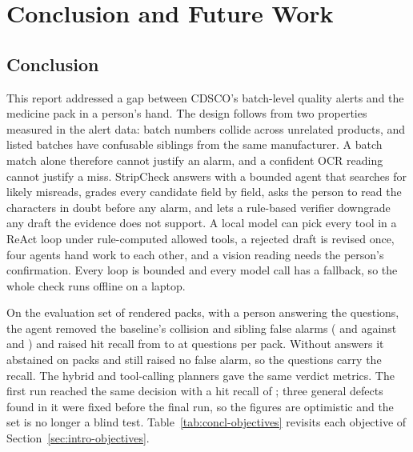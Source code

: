 \chapter{Conclusion and Future Work}
\label{ch:concl}

\section{Conclusion}
\label{sec:concl-conclusion}

This report addressed a gap between CDSCO's batch-level quality alerts and the medicine pack in a
person's hand. The design follows from two properties measured in the alert data: batch numbers
collide across unrelated products, and listed batches have confusable siblings from the same
manufacturer. A batch match alone therefore cannot justify an alarm, and a confident OCR reading
cannot justify a miss. StripCheck answers with a bounded agent that searches for likely misreads,
grades every candidate field by field, asks the person to read the characters in doubt before any
alarm, and lets a rule-based verifier downgrade any draft the evidence does not support. A local
model can pick every tool in a ReAct loop under rule-computed allowed tools, a rejected draft is revised once, four
agents hand work to each other, and a vision reading needs the person's confirmation. Every loop is bounded and every
model call has a fallback, so the whole check runs offline on a laptop.

On the evaluation set of  rendered packs, with a person answering the questions, the
agent removed the baseline's collision and sibling false alarms (
and  against  and
) and raised hit recall from  to
 at  questions per pack. Without answers
it abstained on  packs and still raised no false alarm, so the questions
carry the recall. The hybrid and tool-calling planners gave the same verdict metrics. The first run reached
the same decision with a hit recall of \RunOneRulesOracleHitRecall; three general defects found in
it were fixed before the final run, so the figures are optimistic and the set is no longer a blind test. Table~\ref{tab:concl-objectives} revisits each objective of
Section~\ref{sec:intro-objectives}.

